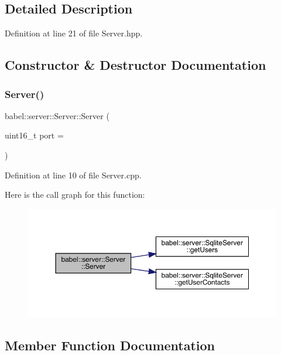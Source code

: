 \subsection{Detailed Description}


Definition at line 21 of file Server.\+hpp.



\subsection{Constructor \& Destructor Documentation}
\mbox{\label{classbabel_1_1server_1_1_server_a45ec873c1eb9c67e4419f14ec2347774}} 
\subsubsection{\texorpdfstring{Server()}{Server()}}
{\footnotesize\ttfamily babel\+::server\+::\+Server\+::\+Server (\begin{DoxyParamCaption}\item[{uint16\+\_\+t}]{port = {} }\end{DoxyParamCaption})}



Definition at line 10 of file Server.\+cpp.

Here is the call graph for this function\+:\nopagebreak
\begin{figure}[H]
\begin{center}
\leavevmode
\includegraphics[width=350pt]{classbabel_1_1server_1_1_server_a45ec873c1eb9c67e4419f14ec2347774_cgraph}
\end{center}
\end{figure}


\subsection{Member Function Documentation}
\mbox{\label{classbabel_1_1server_1_1_server_ab7dba6c341308689bfec7a023a92562b}} 
